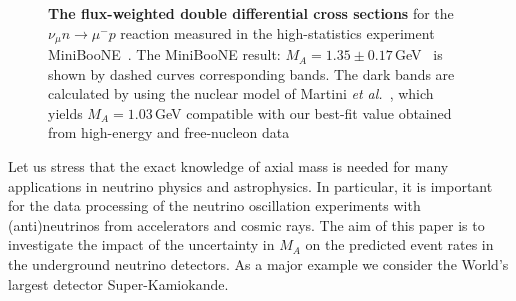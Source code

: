 \begin{figure}[htb!]
\caption{\label{MiniBooNE}\textbf{The flux-weighted double differential cross sections} for the $\nu_{\mu}n\to\mu^-p$ reaction measured in the high-statistics experiment MiniBooNE~\cite{AguilarArevalo:2010zc}. The MiniBooNE result: $M_{A}=1.35\pm0.17$\,GeV~\cite{AguilarArevalo:2010zc} is shown by dashed curves corresponding bands. The dark bands are calculated by using the nuclear model of Martini \textit{et al.}~\cite{Martini:2011wp}, which yields $M_A=1.03$\,GeV compatible with our best-fit value obtained from high-energy and free-nucleon data}
\label{MiniBooNE}
\end{figure}

Let us stress that the exact knowledge of axial mass is needed for many applications in neutrino physics and astrophysics. In particular, it is important for the data processing of the neutrino oscillation experiments with (anti)neutrinos from accelerators and cosmic rays. The aim of this paper is to investigate the impact of the uncertainty in $M_A$ on the predicted event rates in the underground neutrino detectors. As a major example we consider the World's largest detector Super-Kamiokande.
